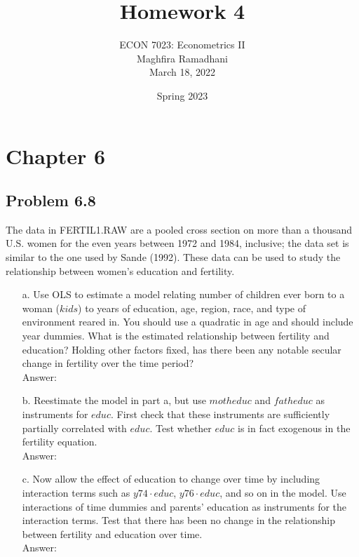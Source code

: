 \documentclass[10pt]{article}
\begin{document}
 
\title{Homework 4}
\author{ECON 7023: Econometrics II\\
Maghfira Ramadhani\\
March 18, 2022}
\date{Spring 2023}
\maketitle

\section*{Chapter 6}
\subsection*{Problem 6.8}
The data in FERTIL1.RAW are a pooled cross section on more than a thousand U.S. women for the even years between 1972 and 1984, inclusive; the data set is similar to the one used by Sande (1992). These data can be used to study the relationship between women's education and fertility.
\begin{enumerate}
\item[a.] Use OLS to estimate a model relating number of children ever born to a woman ($kids$) to years of education, age, region, race, and type of environment reared in. You should use a quadratic in age and should include year dummies. What is the estimated relationship between fertility and education? Holding other factors fixed, has there been any notable secular change in fertility over the time period?
\\ Answer: \\

\item[b.] Reestimate the model in part a, but use $motheduc$ and $fatheduc$ as instruments for $educ$. First check that these instruments are sufficiently partially correlated with $educ$. Test whether $educ$ is in fact exogenous in the fertility equation.
\\ Answer: \\

\item[c.]Now allow the effect of education to change over time by including interaction terms such as $y74\cdot educ$, $y76\cdot educ$, and so on in the model. Use interactions of time dummies and parents’ education as instruments for the interaction terms. Test that there has been no change in the relationship between fertility and education over time.
\\ Answer: \\

\end{enumerate}
\end{document}
